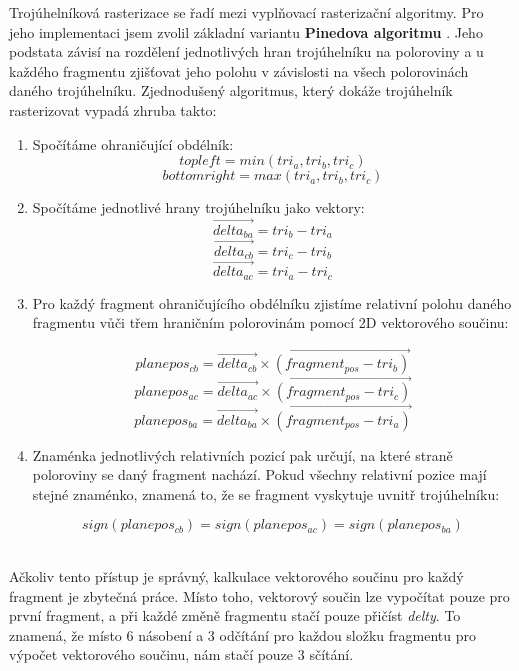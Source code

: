 Trojúhelníková rasterizace se řadí mezi vyplňovací rasterizační algoritmy. 
Pro jeho implementaci jsem zvolil základní variantu \textbf{Pinedova algoritmu} \cite{PinedaAlgorithm}. 
Jeho podstata závisí na rozdělení jednotlivých hran trojúhelníku na poloroviny a u každého fragmentu zjišťovat jeho 
polohu v závislosti na všech polorovinách daného trojúhelníku.
Zjednodušený algoritmus, který dokáže trojúhelník rasterizovat vypadá zhruba takto:\\[\baselineskip]
\begin{minipage}{\textwidth}
\begin{enumerate}
    \item
    {
        Spočítáme ohraničující obdélník:
        \[ topleft = min(tri_a, tri_b, tri_c) \] 
        \[ bottomright = max(tri_a, tri_b, tri_c) \]
    }
    \item
    {
        Spočítáme jednotlivé hrany trojúhelníku jako vektory: 
        \[ \vec{delta_{ba}} = tri_b - tri_a \] 
        \[ \vec{delta_{cb}} = tri_c - tri_b \] 
        \[ \vec{delta_{ac}} = tri_a - tri_c \]
    }
    \item
    {
        Pro každý fragment ohraničujícího obdélníku zjistíme relativní polohu daného fragmentu 
        vůči třem hraničním polorovinám pomocí 2D vektorového součinu:

        \[ planepos_{cb} = \vec{delta_{cb}} \times \vec{(fragment_{pos} - tri_b)}\]
        \[ planepos_{ac} = \vec{delta_{ac}} \times \vec{(fragment_{pos} - tri_c)}\]
        \[ planepos_{ba} = \vec{delta_{ba}} \times \vec{(fragment_{pos} - tri_a)}\]
    }
    \item
    {
        Znaménka jednotlivých relativních pozicí pak určují, na které straně poloroviny
        se daný fragment nachází. Pokud všechny relativní pozice mají stejné znaménko,
        znamená to, že se fragment vyskytuje uvnitř trojúhelníku:

        \[ sign(planepos_{cb}) = sign(planepos_{ac}) = sign(planepos_{ba}) \]
    }
\end{enumerate}
\end{minipage}\\[\baselineskip]

Ačkoliv tento přístup je správný, kalkulace vektorového součinu pro každý fragment je zbytečná
práce. Místo toho, vektorový součin lze vypočítat pouze pro první fragment, a při každé
změně fragmentu stačí pouze přičíst \textit{delty}. To znamená, že místo 6 násobení a 3 odčítání
pro každou složku fragmentu pro výpočet vektorového součinu, nám stačí pouze 3 sčítání.

